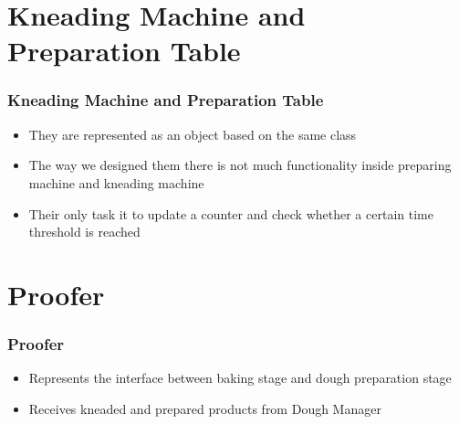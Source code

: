 \documentclass[hyperref={pdfpagelabels=false}]{beamer}
\begin{document}
    \section{Kneading Machine and Preparation Table}
    \begin{frame}
        \frametitle{Kneading Machine and Preparation Table}
        \begin{itemize}
            \item They are represented as an object based on the same class
            \item The way we designed them there is not much functionality inside preparing machine and kneading machine
            \item Their only task it to update a counter and check whether a certain time threshold is reached
        \end{itemize}
    \end{frame}

    \section{Proofer}
    \begin{frame}
        \frametitle{Proofer}
        \begin{itemize}
            \item Represents the interface between baking stage and dough preparation stage
            \item Receives kneaded and prepared products from Dough Manager
        \end{itemize}
    \end{frame}
\end{document}
